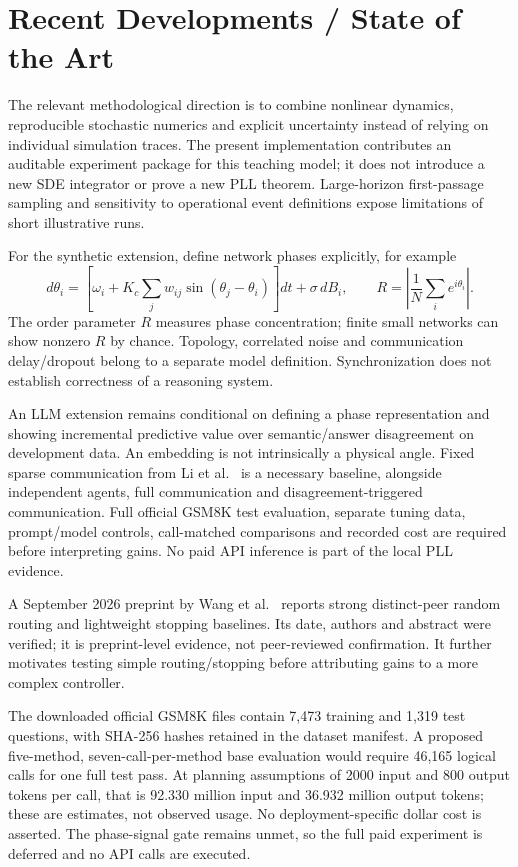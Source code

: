 \documentclass[11pt,a4paper]{article}
\begin{document}
\section{Recent Developments / State of the Art}
The relevant methodological direction is to combine nonlinear dynamics, reproducible stochastic numerics and explicit uncertainty instead of relying on individual simulation traces. The present implementation contributes an auditable experiment package for this teaching model; it does not introduce a new SDE integrator or prove a new PLL theorem. Large-horizon first-passage sampling and sensitivity to operational event definitions expose limitations of short illustrative runs.

For the synthetic extension, define network phases explicitly, for example
\begin{equation}
d\theta_i=\left[\omega_i+K_c\sum_jw_{ij}\sin(\theta_j-\theta_i)\right]dt
+\sigma\,dB_i,
\qquad R=\left|\frac1N\sum_i e^{i\theta_i}\right|.
\end{equation}
The order parameter $R$ measures phase concentration; finite small networks can show nonzero $R$ by chance. Topology, correlated noise and communication delay/dropout belong to a separate model definition. Synchronization does not establish correctness of a reasoning system.

An LLM extension remains conditional on defining a phase representation and showing incremental predictive value over semantic/answer disagreement on development data. An embedding is not intrinsically a physical angle. Fixed sparse communication from Li et al.\ \cite{li2024} is a necessary baseline, alongside independent agents, full communication and disagreement-triggered communication. Full official GSM8K test evaluation, separate tuning data, prompt/model controls, call-matched comparisons and recorded cost are required before interpreting gains. No paid API inference is part of the local PLL evidence.

A September 2026 preprint by Wang et al.\ \cite{wang2026} reports strong distinct-peer random routing and lightweight stopping baselines. Its date, authors and abstract were verified; it is preprint-level evidence, not peer-reviewed confirmation. It further motivates testing simple routing/stopping before attributing gains to a more complex controller.

The downloaded official GSM8K files contain 7,473 training and 1,319 test questions, with SHA-256 hashes retained in the dataset manifest. A proposed five-method, seven-call-per-method base evaluation would require 46,165 logical calls for one full test pass. At planning assumptions of 2000 input and 800 output tokens per call, that is 92.330 million input and 36.932 million output tokens; these are estimates, not observed usage. No deployment-specific dollar cost is asserted. The phase-signal gate remains unmet, so the full paid experiment is deferred and no API calls are executed.
\end{document}
